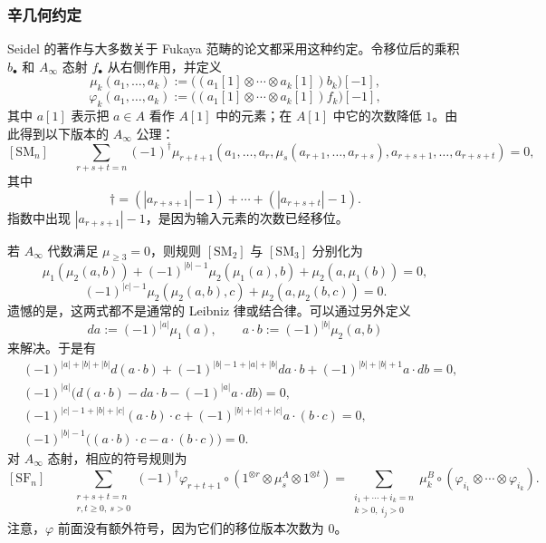 \subsubsection*{辛几何约定}
Seidel 的著作与大多数关于 Fukaya 范畴的论文都采用这种约定。令移位后的乘积 $b_\bullet$ 和 $A_\infty$ 态射 $f_\bullet$ 从右侧作用，并定义
\[
  \mu_k(a_1,\ldots,a_k)
  :=\bigl((a_1[1]\otimes\cdots\otimes a_k[1])b_k\bigr)[-1],
\]
\[
  \varphi_k(a_1,\ldots,a_k)
  :=\bigl((a_1[1]\otimes\cdots\otimes a_k[1])f_k\bigr)[-1],
\]
其中 $a[1]$ 表示把 $a\in A$ 看作 $A[1]$ 中的元素；在 $A[1]$ 中它的次数降低 $1$。由此得到以下版本的 $A_\infty$ 公理：
\[
  [\mathrm{SM}_n]\qquad
  \sum_{r+s+t=n}(-1)^\dagger
  \mu_{r+t+1}(a_1,\ldots,a_r,\mu_s(a_{r+1},\ldots,a_{r+s}),
       a_{r+s+1},\ldots,a_{r+s+t})=0,
\]
其中
\[
  \dagger=(|a_{r+s+1}|-1)+\cdots+(|a_{r+s+t}|-1).
\]
指数中出现 $|a_{r+s+1}|-1$，是因为输入元素的次数已经移位。

若 $A_\infty$ 代数满足 $\mu_{\geq3}=0$，则规则 $[\mathrm{SM}_2]$ 与 $[\mathrm{SM}_3]$ 分别化为
\[
  \mu_1(\mu_2(a,b))
  +(-1)^{|b|-1}\mu_2(\mu_1(a),b)
  +\mu_2(a,\mu_1(b))=0,
\]
\[
  (-1)^{|c|-1}\mu_2(\mu_2(a,b),c)
  +\mu_2(a,\mu_2(b,c))=0.
\]
遗憾的是，这两式都不是通常的 Leibniz 律或结合律。可以通过另外定义
\[
  da:=(-1)^{|a|}\mu_1(a),
  \qquad
  a\cdot b:=(-1)^{|b|}\mu_2(a,b)
\]
来解决。于是有
\begin{align*}
  &(-1)^{|a|+|b|+|b|}d(a\cdot b)
  +(-1)^{|b|-1+|a|+|b|}da\cdot b
  +(-1)^{|b|+|b|+1}a\cdot db=0,\\
  &(-1)^{|a|}\bigl(d(a\cdot b)-da\cdot b-(-1)^{|a|}a\cdot db\bigr)=0,\\
  &(-1)^{|c|-1+|b|+|c|}(a\cdot b)\cdot c
  +(-1)^{|b|+|c|+|c|}a\cdot(b\cdot c)=0,\\
  &(-1)^{|b|-1}\bigl((a\cdot b)\cdot c-a\cdot(b\cdot c)\bigr)=0.
\end{align*}
对 $A_\infty$ 态射，相应的符号规则为
\[
  [\mathrm{SF}_n]\qquad
  \sum_{\substack{r+s+t=n\\r,t\geq0,\ s>0}}(-1)^\dagger
  \varphi_{r+t+1}\circ
  (1^{\otimes r}\otimes\mu_s^A\otimes1^{\otimes t})
  =
  \sum_{\substack{i_1+\cdots+i_k=n\\k>0,\ i_j>0}}
  \mu_k^B\circ(\varphi_{i_1}\otimes\cdots\otimes\varphi_{i_k}).
\]
注意，$\varphi$ 前面没有额外符号，因为它们的移位版本次数为 $0$。

